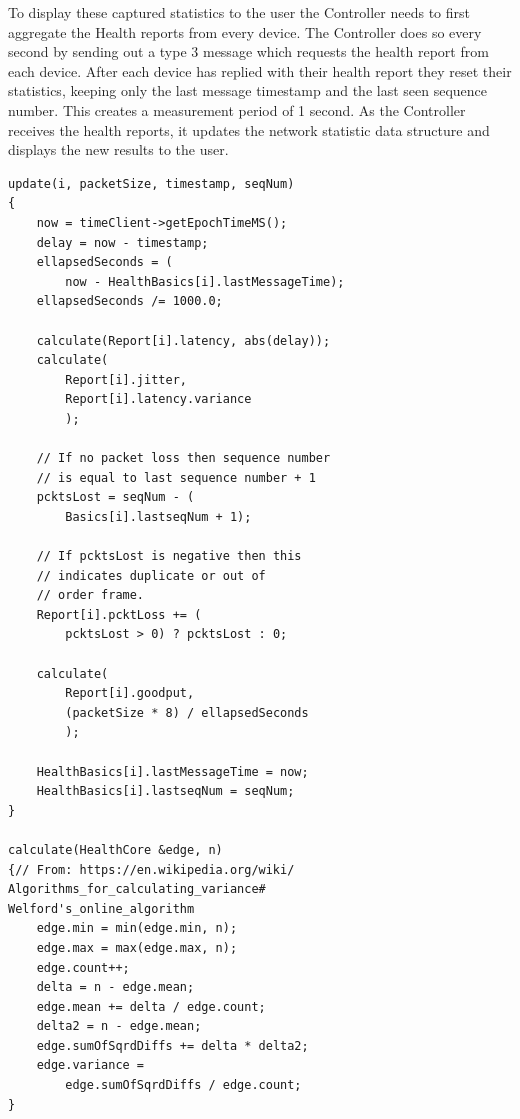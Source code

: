 \documentclass[letterpaper,twocolumn,12pt]{article}
\begin{document}
To display these captured statistics to the user the Controller needs to first aggregate the Health reports from every device. The Controller does so every second by sending out a type 3 message which requests the health report from each device. After each device has replied with their health report they reset their statistics, keeping only the last message timestamp and the last seen sequence number. This creates a measurement period of 1 second. As the Controller receives the health reports, it updates the network statistic data structure and displays the new results to the user.
\begin{verbatim}
update(i, packetSize, timestamp, seqNum)
{
    now = timeClient->getEpochTimeMS();
    delay = now - timestamp;
    ellapsedSeconds = (
        now - HealthBasics[i].lastMessageTime);
    ellapsedSeconds /= 1000.0;

    calculate(Report[i].latency, abs(delay));
    calculate(
        Report[i].jitter,
        Report[i].latency.variance
        );

    // If no packet loss then sequence number
    // is equal to last sequence number + 1
    pcktsLost = seqNum - (
        Basics[i].lastseqNum + 1);

    // If pcktsLost is negative then this
    // indicates duplicate or out of 
    // order frame.
    Report[i].pcktLoss += (
        pcktsLost > 0) ? pcktsLost : 0;

    calculate(
        Report[i].goodput,
        (packetSize * 8) / ellapsedSeconds
        );
    
    HealthBasics[i].lastMessageTime = now;
    HealthBasics[i].lastseqNum = seqNum;
}

calculate(HealthCore &edge, n)
{// From: https://en.wikipedia.org/wiki/
Algorithms_for_calculating_variance#
Welford's_online_algorithm
    edge.min = min(edge.min, n);
    edge.max = max(edge.max, n);
    edge.count++;
    delta = n - edge.mean;
    edge.mean += delta / edge.count;
    delta2 = n - edge.mean;
    edge.sumOfSqrdDiffs += delta * delta2;
    edge.variance = 
        edge.sumOfSqrdDiffs / edge.count;
}
\end{verbatim}
\end{document}
